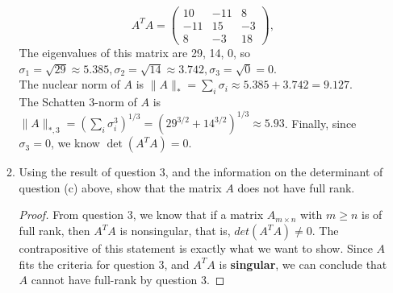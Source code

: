 \documentclass[11pt]{article}
\newcommand{\n}{\vspace{0.2cm}}
\begin{document}
\begin{enumerate}
\begin{enumerate}[label=(\alph*)]
\[			            A^TA = \begin{pmatrix} 10 & -11 & 8 \\ -11 & 15 & -3 \\ 8 & -3 & 18 \end{pmatrix},
		            \]
		            The eigenvalues of this matrix are 29, 14, 0, so \(\sigma_1 = \sqrt{29} \approx 5.385, \sigma_2 = \sqrt{14} \approx 3.742, \sigma_3 = \sqrt{0} = 0\). \n\\
		            The nuclear norm of \(A\) is \(\lVert A \rVert_* = \sum_i \sigma_i \approx 5.385 + 3.742 = 9.127\). \n\\
		            The Schatten 3-norm of \(A\) is \(\lVert A \rVert_{*,3} = \left( \sum_i \sigma_i^3 \right)^{1/3} = \left( 29^{3/2} + 14^{3/2} \right)^{1/3} \approx 5.93\).  Finally, since \(\sigma_3 = 0\), we know \(\det(A^TA) = 0\).
		      \item Using the result of question 3, and the information on the determinant of question (c) above, show that the matrix \(A\) does not have full rank.
		            \begin{proof}
			            From question 3, we know that if a matrix \(A_{m \times n}\) with \(m \geq n\) is of full rank, then \(A^TA\) is nonsingular, that is, \(det(A^TA) \neq 0\).  The contrapositive of this statement is exactly what we want to show.  Since \(A\) fits the criteria for question 3, and \(A^TA\) is \textbf{singular}, we can conclude that \(A\) cannot have full-rank by question 3.
		            \end{proof}
	      \end{enumerate}
\end{enumerate}
\end{document}
